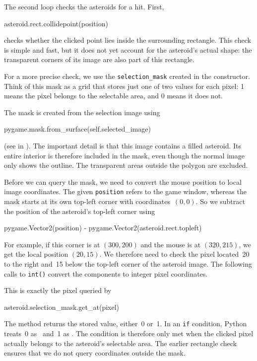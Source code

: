 The second loop checks the asteroids for a hit. First,
\begin{codebox}
	asteroid.rect.collidepoint(position)
\end{codebox}
checks whether the clicked point lies inside the surrounding rectangle. This check is simple and fast, but it does not yet account for the asteroid's actual shape: the transparent corners of its image are also part of this rectangle.

For a more precise check, we use the \texttt{selection\_mask} created in the constructor. Think of this mask as a grid that stores just one of two values for each pixel: 1 means the pixel belongs to the selectable area, and 0 means it does not.

The mask is created from the selection image using
\begin{codebox}
	pygame.mask.from_surface(self.selected_image)
\end{codebox}
(see  in ). The important detail is that this image contains a filled asteroid. Its entire interior is therefore included in the mask, even though the normal image only shows the outline. The transparent areas outside the polygon are excluded.

Before we can query the mask, we need to convert the mouse position to local image coordinates. The given \texttt{position} refers to the game window, whereas the mask starts at its own top-left corner with coordinates~$(0,0)$. So we subtract the position of the asteroid's top-left corner using

\begin{codebox}
	pygame.Vector2(position) - pygame.Vector2(asteroid.rect.topleft)
\end{codebox}

For example, if this corner is at $(300,200)$ and the mouse is at $(320,215)$, we get the local position $(20,15)$. We therefore need to check the pixel located~\SI{20}{\pixel} to the right and~\SI{15}{\pixel} below the top-left corner of the asteroid image. The following calls to \texttt{int()} convert the components to integer pixel coordinates.

This is exactly the pixel queried by
\begin{codebox}
	asteroid.selection_mask.get_at(pixel)
\end{codebox}
The method returns the stored value, either~0 or~1. In an \texttt{if} condition, Python treats~0 as \false\ and~1 as \true. The condition is therefore only met when the clicked pixel actually belongs to the asteroid's selectable area. The earlier rectangle check ensures that we do not query coordinates outside the mask.

